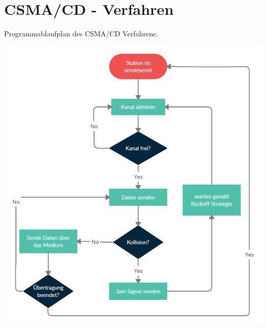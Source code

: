 \documentclass[12pt,a4paper]{article}
\begin{document}
\section{CSMA/CD - Verfahren}
Programmablaufplan des CSMA/CD Verfahrens:
\begin{center}
\includegraphics[scale=0.3]{Bilder/CSMACD.png}
\end{center}
\end{document}
